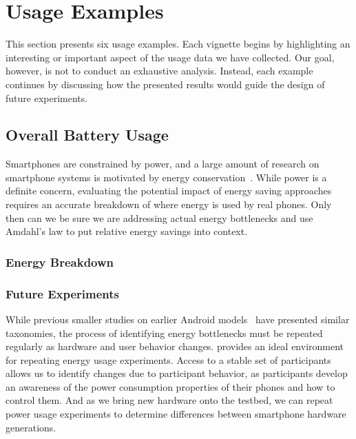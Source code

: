 \section{Usage Examples}
\label{sec-usage}

This section presents six \PhoneLab{} usage examples. Each vignette begins by
highlighting an interesting or important aspect of the usage data we have
collected. Our goal, however, is not to conduct an exhaustive analysis.
Instead, each example continues by discussing how the presented results would
guide the design of future \PhoneLab{} experiments.

\subsection{Overall Battery Usage}
\label{subsec-batteryoverview}

Smartphones are constrained by power, and a large amount of research on
smartphone systems is motivated by energy
conservation~\cite{FIXME,FIXME,FIXME}. While power is a definite concern,
evaluating the potential impact of energy saving approaches requires an
accurate breakdown of where energy is used by real phones. Only then can we
be sure we are addressing actual energy bottlenecks and use Amdahl's law to
put relative energy savings into context.

\subsubsection{Energy Breakdown}

\subsubsection{Future Experiments}

While previous smaller studies on earlier Android
models~\cite{shye:micro:2009} have presented similar taxonomies, the process
of identifying energy bottlenecks must be repeated regularly as hardware and
user behavior changes. \PhoneLab{} provides an ideal environment for
repeating energy usage experiments. Access to a stable set of participants
allows us to identify changes due to participant behavior, as participants
develop an awareness of the power consumption properties of their phones and
how to control them. And as we bring new hardware onto the testbed, we can
repeat power usage experiments to determine differences between smartphone
hardware generations.

